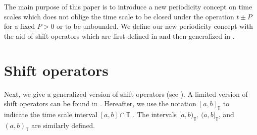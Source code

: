 \documentclass[b5paper,reqno]{amsart}\usepackage{amsfonts}
\theoremstyle{plain}
\numberwithin{equation}{section}
\begin{document}
The main purpose of this paper is to introduce a new periodicity concept on
time scales which does not oblige the time scale to be closed under the
operation $t\pm P$ for a fixed $P>0$ or to be unbounded. We define our new
periodicity concept with the aid of shift operators which are first defined in
\cite{adivar} and then generalized in \cite{bams}.

\section{Shift operators}

Next, we give a generalized version of shift operators (see \cite{bams}). A
limited version of shift operators can be found in \cite{adivar}. Hereafter,
we use the notation $\left[  a,b\right]  _{\mathbb{T}}$ to indicate the time
scale interval $[a,b]\cap\mathbb{T}$ . The intervals $[a,b)_{\mathbb{T}}$,
$(a,b]_{\mathbb{T}}$, and $\left(  a,b\right)  _{\mathbb{T}}$ are similarly defined.
\end{document}
